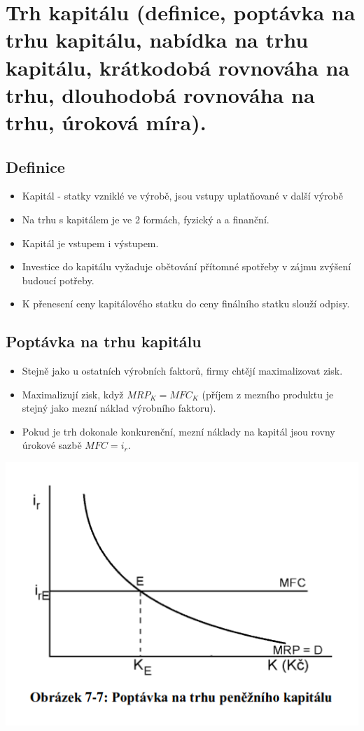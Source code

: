 \clearpage
\section{Trh kapitálu (definice, poptávka na trhu kapitálu, nabídka na trhu kapitálu, krátkodobá
rovnováha na trhu, dlouhodobá rovnováha na trhu, úroková míra).}

\subsection{Definice}
\begin{itemize}
    \item Kapitál - statky vzniklé ve výrobě, jsou vstupy uplatňované v další výrobě
    \item Na trhu s kapitálem je ve 2 formách, fyzický a a finanční.
    \item Kapitál je vstupem i výstupem.
    \item Investice do kapitálu vyžaduje obětování přítomné spotřeby v zájmu zvýšení budoucí potřeby.
    \item K přenesení ceny kapitálového statku do ceny finálního statku slouží odpisy.
\end{itemize}

\subsection{Poptávka na trhu kapitálu}
\begin{itemize}
    \item Stejně jako u ostatních výrobních faktorů, firmy chtějí maximalizovat zisk.
    \item Maximalizují zisk, když $MRP_K=MFC_K$ (příjem z mezního produktu je stejný jako
    mezní náklad výrobního faktoru).
    \item Pokud je trh dokonale konkurenční, mezní náklady na kapitál jsou rovny úrokové sazbě $MFC=i_r$.
\end{itemize}
\includegraphics[width=16cm]{images/18_poptavka.png}

